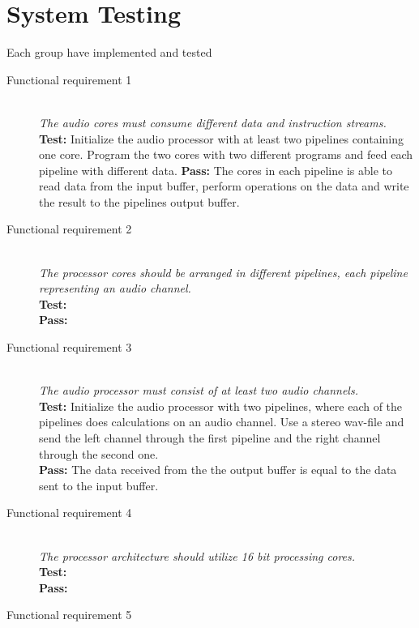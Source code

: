 \section{System Testing}
Each group have implemented and tested 

\begin{description}
    \item[Functional requirement 1] \hfill \\
        \textit{The audio cores must consume different data and instruction streams. } \\
        \textbf{Test:} Initialize the audio processor with at least two pipelines
        containing one core. Program the two cores with two different programs and feed
        each pipeline with different data.
        \textbf{Pass:} The cores in each pipeline is able to read data from the input buffer,
        perform operations on the data and write the result to the pipelines output buffer.\\
    \item[Functional requirement 2] \hfill \\
        \textit{The processor cores should be arranged in different pipelines,
        each pipeline representing an audio channel.} \\
        \textbf{Test:} \\
        \textbf{Pass:} \\
    \item[Functional requirement 3] \hfill \\
        \textit{The audio processor must consist of at least two audio channels. } \\
        \textbf{Test:} Initialize the audio processor with two pipelines, where each of the 
        pipelines does calculations on an audio channel. Use a stereo wav-file and send
        the left channel through the first pipeline and the right channel through the
        second one. \\
        \textbf{Pass:} The data received from the the output buffer is equal to the
        data sent to the input buffer. \\
    \item[Functional requirement 4] \hfill \\
        \textit{The processor architecture should utilize 16 bit processing cores. } \\
        \textbf{Test:} \\
        \textbf{Pass:} \\
    \item[Functional requirement 5] \hfill \\

\end{description}
